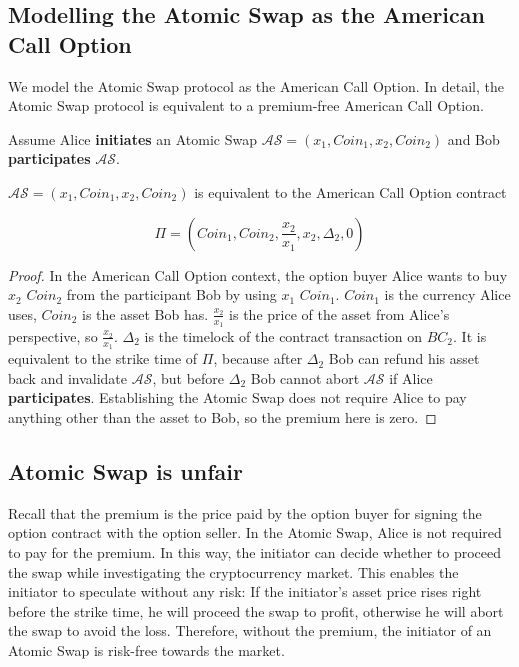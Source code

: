 \subsection{Modelling the Atomic Swap as the American Call Option}

We model the Atomic Swap protocol as the American Call Option.
In detail, the Atomic Swap protocol is equivalent to a premium-free American Call Option.

Assume Alice \textbf{initiates} an Atomic Swap $\mathcal{AS} = (x_1, Coin_1, x_2, Coin_2)$ and Bob \textbf{participates} $\mathcal{AS}$.

\begin{theorem}
$\mathcal{AS} = (x_1, Coin_1, x_2, Coin_2)$ is equivalent to the American Call Option contract

$$
\Pi = (Coin_1, Coin_2, \frac{x_2}{x_1}, x_2, \Delta_2, 0)
$$

\end{theorem}


\begin{proof}
In the American Call Option context, the option buyer Alice wants to buy $x_2$ $Coin_2$ from the participant Bob by using $x_1$ $Coin_1$.
$Coin_1$ is the currency Alice uses, $Coin_2$ is the asset Bob has.
$\frac{x_2}{x_1}$ is the price of the asset from Alice's perspective, so $\frac{x_2}{x_1}$.
$\Delta_2$ is the timelock of the contract transaction on $BC_2$.
It is equivalent to the strike time of $\Pi$, because after $\Delta_2$ Bob can refund his asset back and invalidate $\mathcal{AS}$, but before $\Delta_2$ Bob cannot abort $\mathcal{AS}$ if Alice \textbf{participates}.
Establishing the Atomic Swap does not require Alice to pay anything other than the asset to Bob, so the premium here is zero.
\end{proof}













\subsection{Atomic Swap is unfair}

Recall that the premium is the price paid by the option buyer for signing the option contract with the option seller.
In the Atomic Swap, Alice is not required to pay for the premium.
In this way, the initiator can decide whether to proceed the swap while investigating the cryptocurrency market.
This enables the initiator to speculate without any risk: If the initiator's asset price rises right before the strike time, he will proceed the swap to profit, otherwise he will abort the swap to avoid the loss.
Therefore, without the premium, the initiator of an Atomic Swap is risk-free towards the market.

